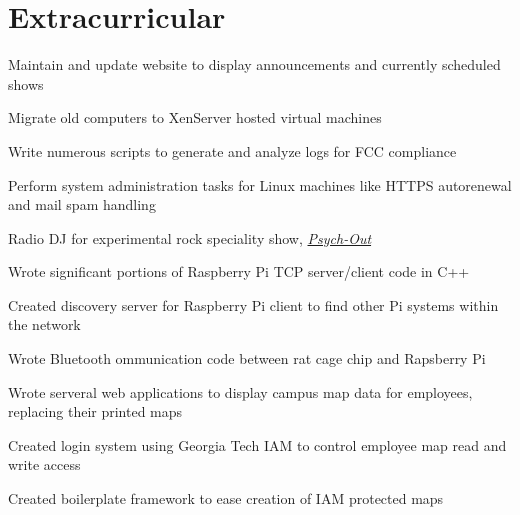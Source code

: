 \documentclass[line]{resume}
\begin{document}
\section{Extracurricular}
\begin{myitemize}
	\item Maintain and update website to display announcements and currently scheduled shows 
	\item Migrate old computers to XenServer hosted virtual machines
	\item Write numerous scripts to generate and analyze logs for FCC compliance
	\item Perform system administration tasks for Linux machines like HTTPS autorenewal and mail spam handling
	\item Radio DJ for experimental rock speciality show, \href{https://www.wrek.org/psychout/}{\textit{Psych-Out}} 
\end{myitemize}

\begin{myitemize}
	\item Wrote significant portions of Raspberry Pi TCP server/client code in C++ 
	\item Created discovery server for Raspberry Pi client to find other Pi systems within the network 
	\item Wrote Bluetooth ommunication code between rat cage chip and  Rapsberry Pi
\end{myitemize}

\begin{myitemize}
	\item Wrote serveral web applications to display campus map data for employees, replacing their printed maps
	\item Created login system using Georgia Tech IAM to control employee map read and write access 
	\item Created boilerplate framework to ease creation of IAM protected maps 
\end{myitemize}
\end{document}
